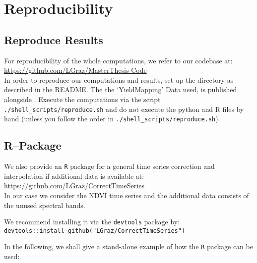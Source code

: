 \chapter{Reproducibility}\label{app:reproducibility}

\section{Reproduce Results}
For reproducibility of the whole computations, we refer to our codebase at:\\ \url{https://github.com/LGraz/MasterThesis-Code}\\ In order to reproduce our computations and results, set up the directory as described in the README. The the `YieldMapping' Data used, is published alongside \cite{perichPixelbasedCropYield2022}. Execute the computations via the script \texttt{./shell\_scripts/reproduce.sh} and do not execute the python and R files by hand (unless you follow the order in \texttt{./shell\_scripts/reproduce.sh}). 

\section{R--Package}
We also provide an \texttt{R} package for a general time series correction and interpolation if additional data is available at: \\
\url{https://github.com/LGraz/CorrectTimeSeries} \\
In our case we consider the NDVI time series and the additional data consists of the unused spectral bands.

We recommend installing it via the \texttt{devtools} package by:\\
\texttt{devtools::install\_github("LGraz/CorrectTimeSeries")}

In the following, we shall give a stand-alone example of how the \texttt{R} package can be used:



